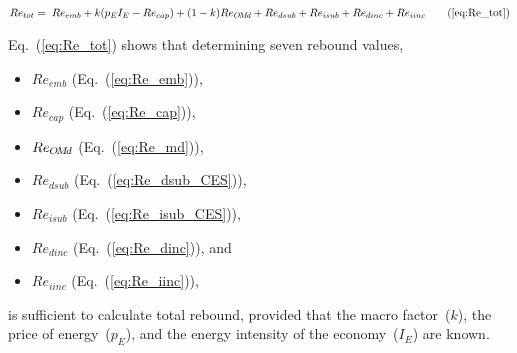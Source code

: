 \begin{align}
  Re_{tot} = \; \Retoteqn{} \tag{\ref{eq:Re_tot}}
\end{align}

Eq.~(\ref{eq:Re_tot}) shows that determining seven rebound values,

\begin{itemize}

  \item $Re_{emb}$ (Eq.~(\ref{eq:Re_emb})), 

  \item $Re_{cap}$ (Eq.~(\ref{eq:Re_cap})), 
  
  \item $Re_{O\!M\!d}$ (Eq.~(\ref{eq:Re_md})),
  
  \item $Re_{dsub}$ (Eq.~(\ref{eq:Re_dsub_CES})),
  
  \item $Re_{isub}$ (Eq.~(\ref{eq:Re_isub_CES})), 
  
  \item $Re_{dinc}$ (Eq.~(\ref{eq:Re_dinc})), and
  
  \item $Re_{iinc}$ (Eq.~(\ref{eq:Re_iinc})),

\end{itemize}
%
is sufficient to calculate total rebound, 
provided that 
the macro factor~($k$),
the price of energy~($p_E$), and
the energy intensity of the economy~($I_E$) 
are known.
